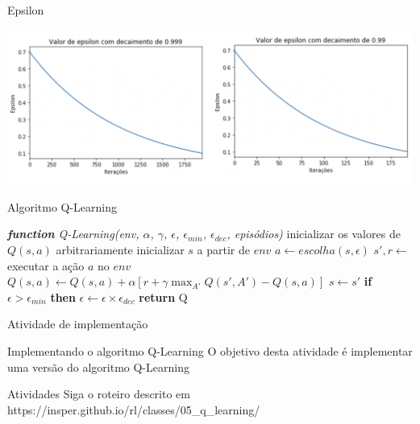\documentclass{beamer}
\begin{document}
\begin{frame}{Epsilon}
	  \begin{center}
		\includegraphics[width=\textwidth]{figuras/epsilon.png}
	\end{center}
\end{frame}

\begin{frame}{Algoritmo Q-Learning}
	
\begin{algorithmic} 
	\STATE \emph{\textbf{function} Q-Learning(env, $\alpha$, $\gamma$, $\epsilon$, $\epsilon_{min}$, $\epsilon_{dec}$, episódios)}
	\STATE inicializar os valores de $Q(s, a)$ arbitrariamente
	\STATE inicializar $s$ a partir de $env$
	\REPEAT
	\STATE $a \leftarrow escolha(s, \epsilon)$
	\STATE $s', r \leftarrow$ executar a ação $a$ no $env$
	\STATE $Q(s,a) \leftarrow Q(s,a) + \alpha [r +\gamma \max_{A'}{Q(s', A')} - Q(s,a)]$
	\STATE$s  \leftarrow s'$
	\STATE \textbf{if} $\epsilon > \epsilon_{min}$ \textbf{then} $\epsilon \leftarrow \epsilon \times \epsilon_{dec}$
	\ENDFOR
	\STATE \textbf{return} Q
\end{algorithmic}	
\end{frame}

\begin{frame}{Atividade de implementação}
	
	\begin{alertblock}{Implementando o algoritmo Q-Learning}
		O objetivo desta atividade é implementar uma versão do algoritmo Q-Learning
	\end{alertblock}
	
	\begin{block}{Atividades}
		Siga o roteiro descrito em https://insper.github.io/rl/classes/05\_q\_learning/ \href{https://insper.github.io/rl/classes/05_q_learning/}
		{}
	\end{block}
	
\end{frame}
\end{document}
